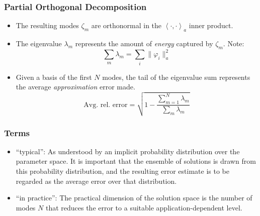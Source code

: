 \documentclass{beamer}
\begin{document}
\begin{frame}[fragile]
  \frametitle{Partial Orthogonal Decomposition}

  \begin{itemize}
  \item The resulting modes $\zeta_m$ are orthonormal in the
    $\left< \cdot, \cdot \right>_a$ inner product.
  \item The eigenvalue $\lambda_m$ represents the amount of \emph{energy}
    captured by $\zeta_m$. Note:
    \[ \sum_m \lambda_m = \sum_i \| \varphi_i \|_a^2 \]
  \item Given a basis of the first $N$ modes, the tail of the eigenvalue sum
    represents the average \emph{approximation} error made.
    \[ \text{Avg.~rel.~error} = \sqrt{1 - \frac{\sum_{m=1}^N \lambda_m}{\sum_m \lambda_m}} \]
  \end{itemize}
\end{frame}

\begin{frame}[fragile]
  \frametitle{Terms}

  \begin{itemize}
  \item ``typical'': As understood by an implicit probability distribution over
    the parameter space. It is important that the ensemble of solutions is drawn
    from this probability distribution, and the resulting error estimate is to
    be regarded as the average error over that distribution.
  \item ``in practice'': The practical dimension of the solution space is the
    number of modes $N$ that reduces the error to a suitable
    application-dependent level.
  \end{itemize}
\end{frame}
\end{document}
